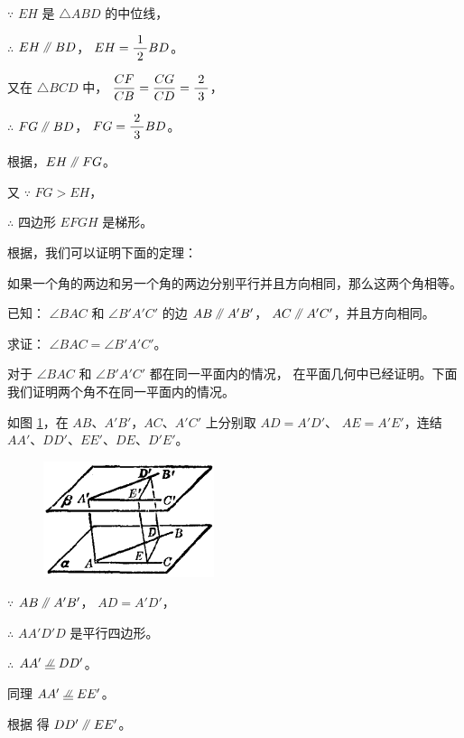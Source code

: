 \begin{enhancedline}
$\because$ \quad $EH$ 是 $\triangle ABD$ 的中位线，

$\therefore$ \quad $EH \pingxing BD$， $EH = \dfrac{\; 1 \;}{2} BD$。

又在 $\triangle BCD$ 中， $\dfrac{CF}{CB} = \dfrac{CG}{CD} = \dfrac{\; 2 \;}{3}$，

$\therefore$ \quad $FG \pingxing BD$， $FG = \dfrac{\; 2 \;}{3} BD$。

根据，$EH \pingxing FG$。

又 $\because$ \quad $FG > EH$，

$\therefore$ \quad 四边形 $EFGH$ 是梯形。

根据，我们可以证明下面的定理：

\begin{dingli}[定理]
    如果一个角的两边和另一个角的两边分别平行并且方向相同，那么这两个角相等。
\end{dingli}

已知： $\angle BAC$ 和 $\angle B'A'C'$ 的边 $AB \pingxing A'B'$， $AC \pingxing A'C'$，并且方向相同。

求证： $\angle BAC = \angle B'A'C'$。

\zhengming 对于 $\angle BAC$ 和 $\angle B'A'C'$ 都在同一平面内的情况，
在平面几何中已经证明。下面我们证明两个角不在同一平面内的情况。

如图 \ref{fig:ltjh-1-16}，在 $AB$、$A'B'$，$AC$、$A'C'$ 上分别取 $AD = A'D'$、
$AE = A'E'$，连结 $AA'$、$DD'$、$EE'$、$DE$、$D'E'$。

\begin{figure}
    \centering
    \includegraphics[width=5cm]{../pic/ltjh-ch1-16.png}
    \caption{}\label{fig:ltjh-1-16}
\end{figure}

$\because$ \quad $AB \pingxing A'B'$， $AD = A'D'$，

$\therefore$ \quad $AA'D'D$ 是平行四边形。

$\therefore$ \quad $AA' \pxqdy DD'$。

同理 \quad $AA' \pxqdy EE'$。

根据 得 $DD' \pingxing EE'$。


\end{enhancedline}
